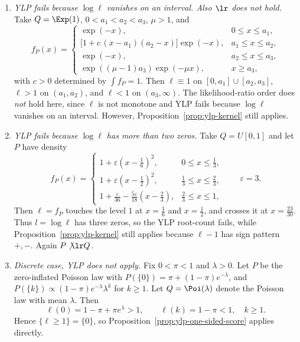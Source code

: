 \documentclass[11pt]{article}
\begin{document}
\begin{example}
\begin{enumerate}[label=\textup{(\Alph*)}]
\item \emph{YLP fails because \(\log\ell\) vanishes on an interval. Also \(\lr\) does not hold.}
Take \(Q=\Exp(1)\), \(0<a_1<a_2<a_3\), \(\mu>1\), and
\[
f_P(x)=
\begin{cases}
\exp(-x), & 0\le x\le a_1,\\[1mm]
\bigl[1+c\,(x-a_1)(a_2-x)\bigr]\exp(-x), & a_1\le x\le a_2,\\[1mm]
\exp(-x), & a_2\le x\le a_3,\\[1mm]
\exp((\mu-1)a_3)\exp(-\mu x), & x\ge a_3,
\end{cases}
\]
with \(c>0\) determined by \(\int f_P=1\). Then \(\ell\equiv 1\) on \([0,a_1]\cup[a_2,a_3]\), \(\ell>1\) on \((a_1,a_2)\), and \(\ell<1\) on \((a_3,\infty)\). The likelihood-ratio order does \emph{not} hold here, since \(\ell\) is not monotone and YLP fails because \(\log\ell\) vanishes on an interval. However, Proposition~\ref{prop:ylp-kernel} still applies. 
\item \emph{YLP fails because \(\log\ell\) has more than two zeros.}
Take \(Q=U[0,1]\) and let \(P\) have density
\[
f_P(x)=
\begin{cases}
1+\varepsilon(x-\tfrac16)^2, & 0\le x\le \tfrac13,\\[1mm]
1+\varepsilon(x-\tfrac12)^2, & \tfrac13\le x\le \tfrac23,\\[1mm]
1+\tfrac{\varepsilon}{36}-\tfrac{5\varepsilon}{18}(x-\tfrac23), & \tfrac23\le x\le 1,
\end{cases}
\qquad \varepsilon=3.
\]
Then \(\ell=f_P\) touches the level \(1\) at \(x=\tfrac16\) and \(x=\tfrac12\), and crosses it at \(x=\tfrac{23}{30}\). Thus \(l=\log\ell\) has three zeros, so the YLP root-count fails, while Proposition~\ref{prop:ylp-kernel} still applies because \(\ell-1\) has sign pattern \(+,-\). Again \(P\not\lr Q\).

\item \emph{Discrete case, YLP does not apply.}
Fix \(0<\pi<1\) and \(\lambda>0\). Let \(P\) be the zero-inflated Poisson law with $P(\{0\})=\pi+(1-\pi)e^{-\lambda}$, and  $P(\{k\}) \propto (1-\pi)e^{-\lambda}{\lambda^k}$ for $k\ge 1$.  Let \(Q=\Poi(\lambda)\) denote the Poisson law with mean \(\lambda\). Then
\[
\ell(0)=1-\pi+\pi e^\lambda>1,\qquad
\ell(k)=1-\pi<1,\quad k\ge 1.
\]
Hence \(\{\ell\ge 1\}=\{0\}\), so Proposition~\ref{prop:ylp-one-sided-score} applies directly. %


\end{enumerate}
\end{example}
\end{document}
